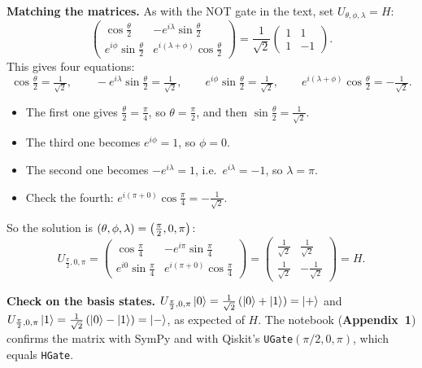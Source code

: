 \documentclass[a4paper, 10pt]{article}
\begin{document}
\begin{solution}
	\noindent \textbf{Matching the matrices.} As with the NOT gate in the text, set \( U_{\theta, \phi, \lambda} = H \):
	\[
		\begin{pmatrix}
			\cos\frac{\theta}{2}            & -e^{i\lambda}\sin\frac{\theta}{2}       \\
			e^{i\phi}\sin\frac{\theta}{2} & e^{i(\lambda + \phi)}\cos\frac{\theta}{2}
		\end{pmatrix} = \frac{1}{\sqrt{2}}\begin{pmatrix} 1 & 1 \\ 1 & -1 \end{pmatrix}.
	\]
	This gives four equations:
	\[
		\cos\tfrac{\theta}{2} = \tfrac{1}{\sqrt{2}}, \qquad
		-e^{i\lambda}\sin\tfrac{\theta}{2} = \tfrac{1}{\sqrt{2}}, \qquad
		e^{i\phi}\sin\tfrac{\theta}{2} = \tfrac{1}{\sqrt{2}}, \qquad
		e^{i(\lambda + \phi)}\cos\tfrac{\theta}{2} = -\tfrac{1}{\sqrt{2}}.
	\]
	\begin{itemize}
		\item The first one gives \( \tfrac{\theta}{2} = \tfrac{\pi}{4} \), so \( \theta = \tfrac{\pi}{2} \), and then \( \sin\tfrac{\theta}{2} = \tfrac{1}{\sqrt{2}} \).
		\item The third one becomes \( e^{i\phi} = 1 \), so \( \phi = 0 \).
		\item The second one becomes \( -e^{i\lambda} = 1 \), i.e.\ \( e^{i\lambda} = -1 \), so \( \lambda = \pi \).
		\item Check the fourth: \( e^{i(\pi + 0)}\cos\tfrac{\pi}{4} = -\tfrac{1}{\sqrt{2}} \). \checkmark
	\end{itemize}
	So the solution is \( (\theta, \phi, \lambda) = \left(\tfrac{\pi}{2}, 0, \pi\right) \):
	\[
		U_{\frac{\pi}{2}, 0, \pi} = \begin{pmatrix}
			\cos\frac{\pi}{4}    & -e^{i\pi}\sin\frac{\pi}{4}     \\
			e^{i0}\sin\frac{\pi}{4} & e^{i(\pi + 0)}\cos\frac{\pi}{4}
		\end{pmatrix} = \begin{pmatrix}
			\frac{1}{\sqrt{2}} & \frac{1}{\sqrt{2}}  \\
			\frac{1}{\sqrt{2}} & -\frac{1}{\sqrt{2}}
		\end{pmatrix} = H.
	\]

	\myspace

	\noindent \textbf{Check on the basis states.} \( U_{\frac{\pi}{2}, 0, \pi}\ket{0} = \tfrac{1}{\sqrt{2}}\left(\ket{0} + \ket{1}\right) = \ket{+} \) and \( U_{\frac{\pi}{2}, 0, \pi}\ket{1} = \tfrac{1}{\sqrt{2}}\left(\ket{0} - \ket{1}\right) = \ket{-} \), as expected of \( H \).
	The notebook (\textbf{Appendix~1}) confirms the matrix with SymPy and with Qiskit's \texttt{UGate}\( (\pi/2, 0, \pi) \), which equals \texttt{HGate}.
\end{solution}
\end{document}
